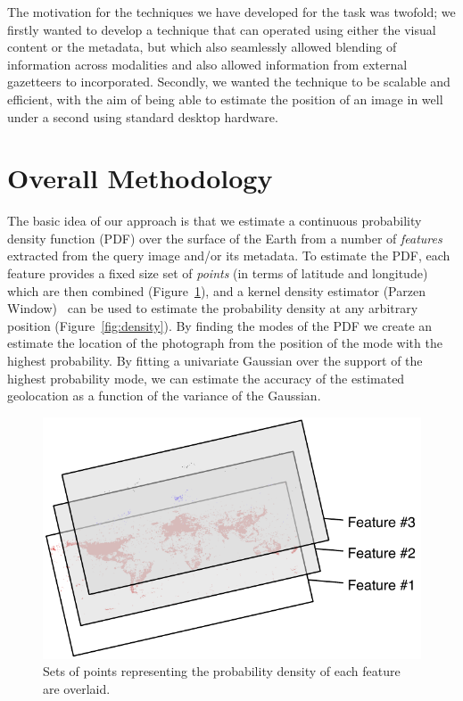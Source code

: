 \documentclass{../acm_proc_article-me11_tweaked}
\begin{document}
The motivation for the techniques we have developed for the task was twofold; we firstly wanted to develop a technique that can operated using either the visual content or the metadata, but which also seamlessly allowed blending of information across modalities and also allowed information from external gazetteers to incorporated. Secondly, we wanted the technique to be scalable and efficient, with the aim of being able to estimate the position of an image in well under a second using standard desktop hardware.

\section{Overall Methodology}
The basic idea of our approach is that we estimate a continuous probability density function (PDF) over the surface of the Earth from a number of \emph{features} extracted from the query image and/or its metadata. To estimate the PDF, each feature provides a fixed size set of \emph{points} (in terms of latitude and longitude) which are then combined (Figure~\ref{fig:features}), and a kernel density estimator (Parzen Window)~\cite{parzen1962estimation} can be used to estimate the probability density at any arbitrary position (Figure~\ref{fig:density}). By finding the modes of the PDF we create an estimate the location of the photograph from the position of the mode with the highest probability. By fitting a univariate Gaussian over the support of the highest probability mode, we can estimate the accuracy of the estimated geolocation as a function of the variance of the Gaussian.

\begin{figure}
	\includegraphics[width=\columnwidth]{images/layers}
	\caption{\label{fig:features}Sets of points representing the probability density of each feature are overlaid.}
\end{figure}
\end{document}
